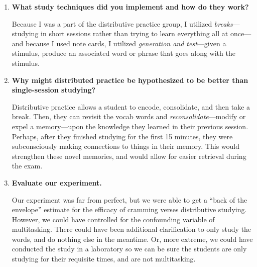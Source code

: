 \documentclass[stu,12pt,floatsintext]{apa7}
\begin{document}
\begin{enumerate}
    \item \textbf{What study techniques did you implement and how do they work?}

    Because I was a part of the distributive practice group, I utilized \textit{breaks}---studying in short sessions rather than trying to learn everything all at once---and because I used note cards, I utilized \textit{generation and test}---given a stimulus, produce an associated word or phrase that goes along with the stimulus. 

    \item \textbf{Why might distributed practice be hypothesized to be better than single-session studying?}

    Distributive practice allows a student to encode, consolidate, and then take a break. Then, they can revisit the vocab words and \textit{reconsolidate}---modify or expel a memory---upon the knowledge they learned in their previous session. Perhaps, after they finished studying for the first 15 minutes, they were subconsciously making connections to things in their memory. This would strengthen these novel memories, and would allow for easier retrieval during the exam.

    \item \textbf{Evaluate our experiment.}

    Our experiment was far from perfect, but we were able to get a ``back of the envelope'' estimate for the efficacy of cramming verses distributive studying. However, we could have controlled for the confounding variable of multitasking. There could have been additional clarification to only study the words, and do nothing else in the meantime. Or, more extreme, we could have conducted the study in a laboratory so we can be sure the students are only studying for their requisite times, and are not multitasking.
\end{enumerate}
\end{document}
